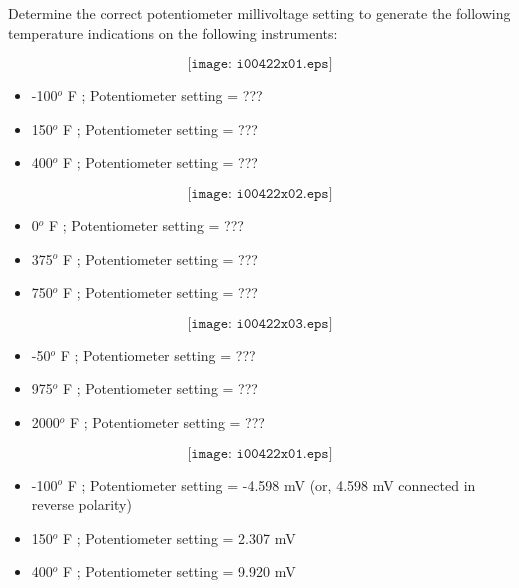 

Determine the correct potentiometer millivoltage setting to generate the following temperature indications on the following instruments:

$$\texttt{[image: i00422x01.eps]}$$

\begin{itemize}
\item{} -100$^{o}$ F ; Potentiometer setting = ??? 
\item{} 150$^{o}$ F ; Potentiometer setting = ??? 
\item{} 400$^{o}$ F ; Potentiometer setting = ??? 
\end{itemize}

\vskip 10pt

$$\texttt{[image: i00422x02.eps]}$$

\begin{itemize}
\item{} 0$^{o}$ F ; Potentiometer setting = ??? 
\item{} 375$^{o}$ F ; Potentiometer setting = ??? 
\item{} 750$^{o}$ F ; Potentiometer setting = ??? 
\end{itemize}

\vskip 10pt

$$\texttt{[image: i00422x03.eps]}$$

\begin{itemize}
\item{} -50$^{o}$ F ; Potentiometer setting = ??? 
\item{} 975$^{o}$ F ; Potentiometer setting = ??? 
\item{} 2000$^{o}$ F ; Potentiometer setting = ??? 
\end{itemize}







$$\texttt{[image: i00422x01.eps]}$$

\begin{itemize}
\item{} -100$^{o}$ F ; Potentiometer setting = -4.598 mV (or, 4.598 mV connected in reverse polarity) 
\item{} 150$^{o}$ F ; Potentiometer setting = 2.307 mV 
\item{} 400$^{o}$ F ; Potentiometer setting = 9.920 mV 
\end{itemize}

